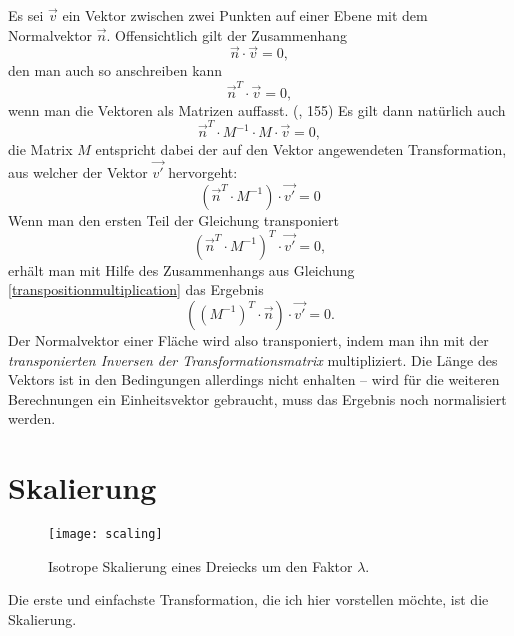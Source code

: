 Es sei $\vec v$ ein Vektor zwischen zwei Punkten auf einer Ebene mit dem Normalvektor $\vec n$. Offensichtlich gilt der Zusammenhang
\begin{equation}
 \vec n \cdot \vec v = 0,
\end{equation}
den man auch so anschreiben kann
\begin{equation}
 \vec{n}^T \cdot \vec{v} = 0,
\end{equation}
wenn man die Vektoren als Matrizen auffasst. (\vgl \citep{script:german}, 155) Es gilt dann natürlich auch
\begin{equation}
 \vec{n}^T \cdot M^{-1} \cdot M \cdot \vec{v} = 0,
\end{equation}
die Matrix $M$ entspricht dabei der auf den Vektor angewendeten Transformation, aus welcher der Vektor $\vec{v'}$ hervorgeht:
\begin{equation}
 \left( \vec{n}^T \cdot M^{-1} \right) \cdot \vec{v'} = 0
\end{equation}
Wenn man den ersten Teil der Gleichung transponiert
\begin{equation}
 \left( \vec{n}^T \cdot M^{-1} \right)^T \cdot \vec{v'} = 0,
\end{equation}
erhält man mit Hilfe des Zusammenhangs aus Gleichung \ref{transpositionmultiplication} das Ergebnis
\begin{equation}
 \left( \left(M^{-1}\right)^T \cdot \vec{n} \right) \cdot \vec{v'} = 0.
\end{equation}
Der Normalvektor einer Fläche wird also transponiert, indem man ihn mit der \emph{transponierten Inversen der Transformationsmatrix} multipliziert. Die Länge des Vektors ist in den Bedingungen allerdings nicht enhalten -- wird für die weiteren Berechnungen ein Einheitsvektor gebraucht, muss das Ergebnis noch normalisiert werden.

\section{Skalierung}
\label{scaling}

\begin{wrapfigure}{r}{0.5\textwidth}
  \vspace{-10pt}
  \texttt{[image: scaling]}
  \vspace{-10pt}
  \caption{Isotrope Skalierung eines Dreiecks um den Faktor $\lambda$.}
\end{wrapfigure}

Die erste und einfachste Transformation, die ich hier vorstellen möchte, ist die Skalierung.

